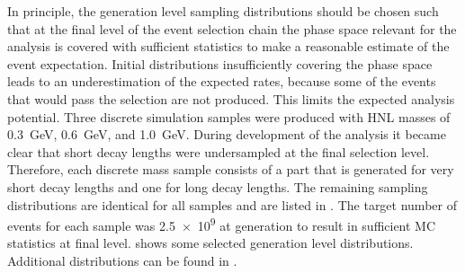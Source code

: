 In principle, the generation level sampling distributions should be chosen such that at the final level of the event selection chain the phase space relevant for the analysis is covered with sufficient statistics to make a reasonable estimate of the event expectation. Initial distributions insufficiently covering the phase space leads to an underestimation of the expected rates, because some of the events that would pass the selection are not produced. This limits the expected analysis potential. Three discrete simulation samples were produced with HNL masses of \SI{0.3}{\GeV}, \SI{0.6}{\GeV}, and \SI{1.0}{\GeV}. During development of the analysis it became clear that short decay lengths were undersampled at the final selection level. Therefore, each discrete mass sample consists of a part that is generated for very short decay lengths and one for long decay lengths. The remaining sampling distributions are identical for all samples and are listed in . The target number of events for each sample was \SI{2.5e9}{} at generation to result in sufficient MC statistics at final level.  shows some selected generation level distributions. Additional distributions can be found in .

